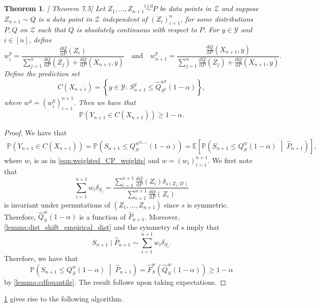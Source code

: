 \documentclass[11pt, titlepage]{article} %
\newcommand{\R}{\mathrm}
\newcommand{\Prob}[1]{\mathbb{P}\left( #1 \right)}
\newcommand{\Exp}[3]{\mathbb{E}\left#2 #1 \right#3}
\numberwithin{equation}{section}
\newtheorem{theorem}{Theorem}
\theoremstyle{definition}
\numberwithin{theorem}{section}
\numberwithin{lemma}{section}
\numberwithin{corollary}{section}
\numberwithin{proposition}{section}
\numberwithin{definition}{section}
\numberwithin{remark}{section}
\begin{document}
\begin{theorem}
\label{thm:dist_shift_coverage}[\cite{angelopoulos2024theoreticalfoundationsconformalprediction} Theorem 7.5]
    Let \(Z_1, \ldots, Z_{n+1} \overset{\R{i.i.d}}{\sim} P \) be data points in \(\mathcal{Z}\) and suppose \(Z_{n+1} \sim Q\) is a data point in \(\mathcal{Z}\) independent of \((Z_i)_{i=1}^n\), for some distributions \(P, Q\) on \(\mathcal{Z}\) such that \(Q\) is absolutely continuous with respect to \(P\). For \(y \in \mathcal{Y}\) and \(i \in [n]\), define \[
        w_i^y = \frac{\frac{\R{d}Q}{\R{d}P}(Z_i)}{\sum_{j=1}^n \frac{\R{d}Q}{\R{d}P}(Z_j) + \frac{\R{d}Q}{\R{d}P}(X_{n+1}, y)} \quad \R{and} \quad w_{n+1}^y = \frac{\frac{\R{d}Q}{\R{d}P}(X_{n+1}, y)}{\sum_{j=1}^{n} \frac{\R{d}Q}{\R{d}P}(Z_j) + \frac{\R{d}Q}{\R{d}P}(X_{n+1}, y)}.
    \] Define the prediction set \[
        C(X_{n+1}) = \left\{y \in \mathcal{Y} : \, S_{n+1}^y \leq \hat{Q}^{w^y}_{S^y}(1-\alpha) \right\},
    \] where \(w^y = (w_i^y)_{i=1}^{n+1}\). Then we have that \[\Prob{Y_{n+1} \in C(X_{n+1})} \geq 1-\alpha.\]
\end{theorem}
\begin{proof}
    We have that \begin{align*}
        \Prob{Y_{n+1} \in C(X_{n+1})} = \Prob{S_{n+1} \leq Q^{w^{Y_{n+1}}}_S(1-\alpha)} = \Exp{ \Prob{S_{n+1} \leq Q^{w}_S(1-\alpha) \;\middle\vert\;  \hat{P}_{n+1} }}{[}{]}, 
    \end{align*} where \(w_i\) is as in \cref{eqn:weighted_CP_weights} and \(w = (w_i)_{i=1}^{n+1}\). We first note that \[\sum_{i=1}^{n+1} w_i \delta_{S_i} = \frac{\sum_{i=1}^{n+1} \frac{\R{d}Q}{\R{d}P}(Z_i) \delta_{s(Z_i; D)}}{\sum_{i=1}^{n+1} \frac{\R{d}Q}{\R{d}P}(Z_i)}\] is invariant under permutations of \((Z_1, \ldots, Z_{n+1})\) since \(s\) is symmetric. Therefore, \(\hat{Q}^w_S (1-\alpha)\) is a function of \(\hat{P}_{n+1}\). Moreover, \cref{lemma:dist_shift_empirical_dist} and the symmetry of \(s\) imply that \[S_{n+1} \; | \; \hat{P}_{n+1} \sim \sum_{i=1}^{n+1} w_i \delta_{S_i}.\] Therefore, we have that \[\Prob{S_{n+1} \leq Q^{w}_S(1-\alpha) \;\middle\vert\;  \hat{P}_{n+1} } = \hat{F}^w_S(\hat{Q}^w_S(1-\alpha)) \geq 1-\alpha\] by \cref{lemma:cdfquantile}. The result follows upon taking expectations.
\end{proof}

\noindent
\cref{thm:dist_shift_coverage} gives rise to the following algorithm.
\end{document}
